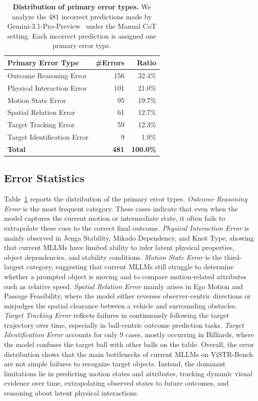 \begin{table}[!t]
    \centering
    \caption{
        \textbf{Distribution of primary error types.}
        We analyze the 481 incorrect predictions made by Gemini-3.1-Pro-Preview~\citep{Gemini} under the Manual CoT setting.
        Each incorrect prediction is assigned one primary error type.
    }
    \label{tab:error_distribution}
    \small
    \begin{tabular}{lrr}
        \toprule
        \textbf{Primary Error Type} & \textbf{\#Errors} & \textbf{Ratio} \\
        \midrule
        Outcome Reasoning Error & 156 & 32.4\% \\
        Physical Interaction Error & 101 & 21.0\% \\
        Motion State Error & 95 & 19.7\% \\
        Spatial Relation Error & 61 & 12.7\%  \\
        Target Tracking Error & 59 & 12.3\% \\
        Target Identification Error & 9 & 1.9\%  \\
        \midrule
        \textbf{Total} & \textbf{481} & \textbf{100.0\%} \\
        \bottomrule
    \end{tabular}
\end{table}

\subsection{Error Statistics}

Table~\ref{tab:error_distribution} reports the distribution of the primary error types.
\emph{Outcome Reasoning Error} is the most frequent category. These cases indicate that even when the model captures the current motion or intermediate state, it often fails to extrapolate these cues to the correct final outcome.
\emph{Physical Interaction Error} is mainly observed in Jenga Stability, Mikado Dependency, and Knot Type, showing that current MLLMs have limited ability to infer latent physical properties, object dependencies, and stability conditions.
\emph{Motion State Error} is the third-largest category, suggesting that current MLLMs still struggle to determine whether a prompted object is moving and to compare motion-related attributes such as relative speed.
\emph{Spatial Relation Error} mainly arises in Ego Motion and Passage Feasibility, where the model either reverses observer-centric directions or misjudges the spatial clearance between a vehicle and surrounding obstacles.
\emph{Target Tracking Error} reflects failures in continuously following the target trajectory over time, especially in ball-centric outcome prediction tasks.
\emph{Target Identification Error} accounts for only 9 cases, mostly occurring in Billiards, where the model confuses the target ball with other balls on the table.
Overall, the error distribution shows that the main bottlenecks of current MLLMs on ViSTR-Bench are not simple failures to recognize target objects.
Instead, the dominant limitations lie in predicting motion states and attributes, tracking dynamic visual evidence over time, extrapolating observed states to future outcomes, and reasoning about latent physical interactions.

